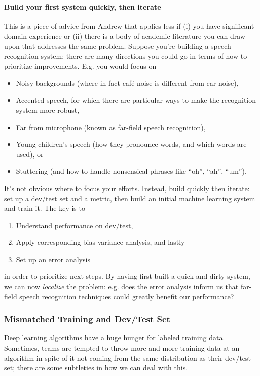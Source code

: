 \documentclass[12pt]{article}
\begin{document}
\paragraph{Build your first system quickly, then iterate} This is a piece of advice from Andrew 
that applies less if (i) you have significant domain experience or (ii) there is a body of academic literature
you can draw upon that addresses the same problem. 
Suppose you're building a speech recognition system: there are many directions you could go in terms of how to prioritize 
improvements. E.g. you would focus on
\begin{itemize}[topsep=2pt,itemsep=0.5pt,partopsep=1pt,parsep=1pt]
  \item Noisy backgrounds (where in fact caf\'e noise is different from car noise),
  \item Accented speech, for which there are particular ways to make the recognition system more robust,
  \item Far from microphone (known as far-field speech recognition),
  \item Young children's speech (how they pronounce words, and which words are used), or
  \item Stuttering (and how to handle nonsensical phrases like ``oh'', ``ah'', ``um''). \end{itemize}
It's not obvious where to focus your efforts. Instead, build quickly then iterate: set up a dev/test set and
a metric, then build an initial machine learning system and train it. The key is to
\begin{enumerate}[topsep=2pt,itemsep=0.5pt,partopsep=1pt,parsep=1pt] \item Understand performance on dev/test, 
\item Apply corresponding bias-variance analysis, and lastly
\item Set up an error analysis \end{enumerate}
in order to prioritize next steps. By having first built a quick-and-dirty system, 
we can now \emph{localize} the problem: e.g. does the error
analysis inform us that far-field speech recognition techniques could greatly benefit our performance?

\subsubsection{Mismatched Training and Dev/Test Set} Deep learning algorithms have a huge hunger for 
labeled training data. Sometimes, teams are tempted to throw more and more training data at an algorithm
in spite of it not coming from the same distribution as their dev/test set; there are some subtleties
in how we can deal with this.
\end{document}
